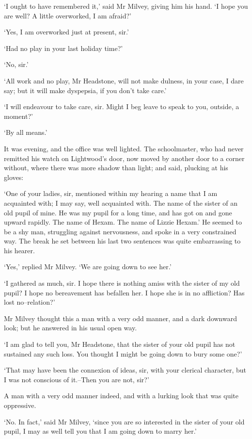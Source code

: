 ‘I ought to have remembered it,’ said Mr Milvey, giving him his hand. ‘I
hope you are well? A little overworked, I am afraid?’

‘Yes, I am overworked just at present, sir.’

‘Had no play in your last holiday time?’

‘No, sir.’

‘All work and no play, Mr Headstone, will not make dulness, in your
case, I dare say; but it will make dyspepsia, if you don’t take care.’

‘I will endeavour to take care, sir. Might I beg leave to speak to you,
outside, a moment?’

‘By all means.’

It was evening, and the office was well lighted. The schoolmaster, who
had never remitted his watch on Lightwood’s door, now moved by another
door to a corner without, where there was more shadow than light; and
said, plucking at his gloves:

‘One of your ladies, sir, mentioned within my hearing a name that I am
acquainted with; I may say, well acquainted with. The name of the sister
of an old pupil of mine. He was my pupil for a long time, and has got on
and gone upward rapidly. The name of Hexam. The name of Lizzie Hexam.’
He seemed to be a shy man, struggling against nervousness, and spoke in
a very constrained way. The break he set between his last two sentences
was quite embarrassing to his hearer.

‘Yes,’ replied Mr Milvey. ‘We are going down to see her.’

‘I gathered as much, sir. I hope there is nothing amiss with the sister
of my old pupil? I hope no bereavement has befallen her. I hope she is
in no affliction? Has lost no--relation?’

Mr Milvey thought this a man with a very odd manner, and a dark downward
look; but he answered in his usual open way.

‘I am glad to tell you, Mr Headstone, that the sister of your old pupil
has not sustained any such loss. You thought I might be going down to
bury some one?’

‘That may have been the connexion of ideas, sir, with your clerical
character, but I was not conscious of it.--Then you are not, sir?’

A man with a very odd manner indeed, and with a lurking look that was
quite oppressive.

‘No. In fact,’ said Mr Milvey, ‘since you are so interested in the
sister of your old pupil, I may as well tell you that I am going down to
marry her.’

